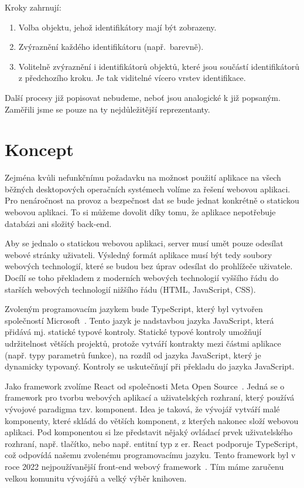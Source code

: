 Kroky zahrnují:
\begin{enumerate}
  \item Volba objektu, jehož identifikátory mají být zobrazeny.
  \item Zvýraznění každého identifikátoru (např.~barevně).
  \item Volitelně zvýraznění i identifikátorů objektů, které jsou součástí identifikátorů z předchozího kroku.
        Je tak viditelné vícero vrstev identifikace.
\end{enumerate}

Další procesy již popisovat nebudeme, neboť jsou analogické k již popsaným.
Zaměřili jsme se pouze na ty nejdůležitější reprezentanty.

\section{Koncept}\label{section:concept}

Zejména kvůli nefunkčnímu požadavku na možnost použití aplikace na všech běžných desktopových operačních systémech volíme za řešení webovou aplikaci.
Pro nenáročnost na provoz a bezpečnost dat se bude jednat konkrétně o statickou webovou aplikaci.
To si můžeme dovolit díky tomu, že aplikace nepotřebuje databázi ani složitý back-end.

Aby se jednalo o statickou webovou aplikaci, server musí umět pouze odesílat webové stránky uživateli.
Výsledný formát aplikace musí být tedy soubory webových technologií, které se budou bez úprav odesílat do prohlížeče uživatele.
Docílí se toho překladem z moderních webových technologií vyššího řádu do starších webových technologií nižšího řádu (HTML, JavaScript, CSS).

Zvoleným programovacím jazykem bude TypeScript, který byl vytvořen společností Microsoft~\cite{microsoft_typescriptjavascript_}.
Tento jazyk je nadstavbou jazyka JavaScript, která přidává mj. statické typové kontroly.
Statické typové kontroly umožňují udržitelnost větších projektů, protože vytváří kontrakty mezi částmi aplikace (např. typy parametrů funkce), na rozdíl od jazyka JavaScript, který je dynamicky typovaný.
Kontroly se uskutečňují při překladu do jazyka JavaScript.

Jako framework zvolíme React od společnosti Meta Open Source~\cite{react_2023}.
Jedná se o framework pro tvorbu webových aplikací a uživatelských rozhraní, který používá vývojové paradigma tzv. komponent.
Idea je taková, že vývojář vytváří malé komponenty, které skládá do větších komponent, z kterých nakonec složí webovou aplikaci.
Pod komponentou si lze představit nějaký ovládací prvek uživatelského rozhraní, např. tlačítko, nebo např. entitní typ z \acrshort{er}.
React podporuje TypeScript, což odpovídá našemu zvolenému programovacímu jazyku.
Tento framework byl v roce 2022 nejpoužívanější front-end webový framework~\cite{stackoverflow_developersurvey_}.
Tím máme zaručenu velkou komunitu vývojářů a velký výběr knihoven.

